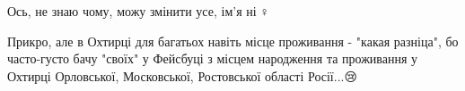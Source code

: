 \begin{itemize}
Ось, не знаю чому, можу змінити усе, ім'я ні🤷♀️

 

Прикро, але в Охтирці для багатьох навіть місце проживання - "какая разніца",
бо часто-густо бачу "своїх" у Фейсбуці з місцем народження та проживання у
Охтирці Орловської, Московської, Ростовської області Росії...😢
\end{itemize}


